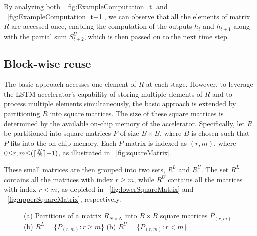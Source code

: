 By analyzing both \figurename{~\ref{fig:ExampleComputation_t}} and \figurename{~\ref{fig:ExampleComputation_t+1}}, we can observe that all the elements of matrix $R$ are accessed once, enabling the computation of the outputs $h_t$ and $h_{t{+}1}$ along with the partial sum $S^U_{t{+}2}$, which is then passed on to the next time step.

\subsection{Block-wise reuse}
The basic approach accesses one element of $R$ at each stage. However, to leverage the LSTM accelerator's capability of storing multiple elements of $R$ and to process multiple elements simultaneously, the basic approach is extended by partitioning $R$ into square matrices. The size of these square matrices is determined by the available on-chip memory of the accelerator. Specifically, let $R$ be partitioned into square matrices $P$ of size $B{\times}B$, where $B$ is chosen such that $P$ fits into the on-chip memory. Each $P$ matrix is indexed as $(r,m)$, where $0{\le}r,m{\le} (\lceil\frac{N}{B}\rceil{-}1)$, as illustrated in \figurename{~\ref{fig:squareMatrix}}.

These small matrices are then grouped into two sets, $R^L$ and $R^U$. The set $R^L$ contains all the matrices with index $r{\geq}m$, while $R^U$ contains all the matrices with index $r{<}m$, as depicted in \figurename{~\ref{fig:lowerSquareMatrix}} and \figurename{~\ref{fig:upperSquareMatrix}}, respectively.
\begin{figure}[htb!]
	\centering
	\caption{(a) Partitions of a matrix $R_{N{\times}N}$ into $B{\times}B$ square matrices $P_{(r,m)}$ (b) $R^L{=}\{P_{(r,m)}:r{\geq}m$\} (b) $R^U{=}\{P_{(r,m)}:r{<}m$\}	}
	\label{fig:SquareMatrices}
\end{figure} 

